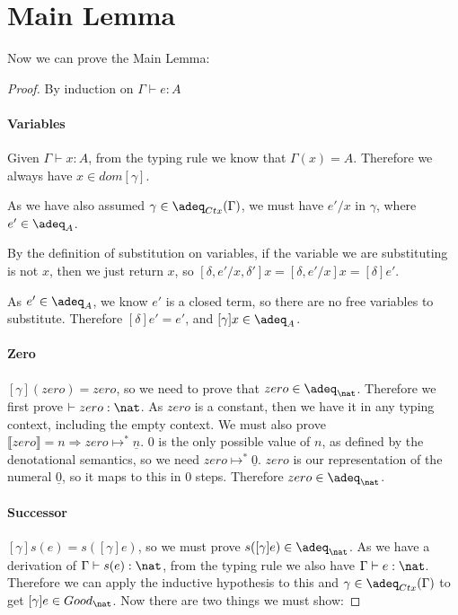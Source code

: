 

\section{Main Lemma}
 
Now we can prove the Main Lemma:

\begin{proof}
By induction on $\Gamma \vdash e : A$

\paragraph{Variables} 
Given $\Gamma \vdash x : A$, from the typing rule we know that $\Gamma(x) = A$. Therefore we always have $x \in dom [\gamma]$.

As we have also assumed $\gamma \in \adeq_{Ctx}(\Gamma)$, we must have $e'/x$ in $\gamma$, where $e' \in \adeq_A$. 

By the definition of substitution on variables, if the variable we are substituting is not $x$, then we just return $x$, so $[ \delta, e'/x, \delta']x = [\delta, e'/x]x = [\delta]e'$. 

As $e' \in \adeq_A$, we know $e'$ is a closed term, so there are no free variables to substitute. Therefore $[\delta]e' = e'$, and $[\gamma]x \in \adeq_A$.  

\paragraph{Zero} $[\gamma](zero) = zero$, so we need to prove that $zero \in \adeq_{\nat}$. Therefore we first prove $\vdash zero : \nat$. As $zero$ is a constant, then we have it in any typing context, including the empty context. We must also prove $\llbracket zero \rrbracket = n \Rightarrow zero \mapsto^* \underline{n}$. 0 is the only possible value of $n$, as defined by the denotational semantics, so we need $zero \mapsto^* \underline{0}$. $zero$ is our representation of the numeral $\underline{0}$, so it maps to this in 0 steps. Therefore $zero \in \adeq_{\nat}$.

\paragraph{Successor}$[\gamma]s(e) = s([\gamma]e)$, so we must prove $s([\gamma]e) \in \adeq_{\nat}$. As we have a derivation of $\Gamma \vdash s(e) : \nat$, from the typing rule we also have $\Gamma \vdash e : \nat$. Therefore we can apply the inductive hypothesis to this and $\gamma \in \adeq_{Ctx}(\Gamma)$ to get $[\gamma]e \in Good_{\nat}$. Now there are two things we must show:


\end{proof}
